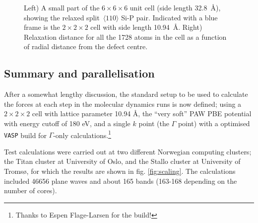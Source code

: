 \documentclass[11pt,bibliography=totoc,index=totoc]{scrbook}   %
\newcommand{\vasp}{{\texttt{VASP}}} %
\begin{document}
\begin{figure}[htbp]
  \centering
  \caption{Left) A small part of the $6\times 6\times 6$ unit cell (side length 32.8~Å), showing the 
  relaxed split~$\langle 110 \rangle$ Si-P pair.
  Indicated with a blue frame is the $2\times 2\times 2$ cell with side length 10.94~Å.
  Right) Relaxation distance for all the 1728 atoms in the cell as a function of radial distance from the defect centre.}
  \label{fig:tests/cellsize}
\end{figure}

%
\subsection{Summary and parallelisation}\label{sec:parameters:summary}
%

After a somewhat lengthy discussion, the standard setup to be used to calculate the forces at each step in the molecular dynamics runs is now defined; using a $2\times 2\times 2$ cell with lattice parameter 10.94 Å, the ``very soft'' PAW PBE potential with energy cutoff of 180 eV, and a single $k$ point (the $\Gamma$ point) with a optimised {\vasp} build for $\Gamma$-only calculations.\footnote{Thanks to Espen Flage-Larsen for the build!} 

Test calculations were carried out at two different Norwegian computing clusters; the Titan cluster at University of Oslo, 
and the Stallo cluster at University of Tromsø, for which the results are shown in fig. \ref{fig:scaling}.
The calculations included 46656 plane waves and about 165 bands (163-168 depending on the number of cores).


%
%
%
%
%
%
%
%
%
%
%
%
%
%
\end{document}
